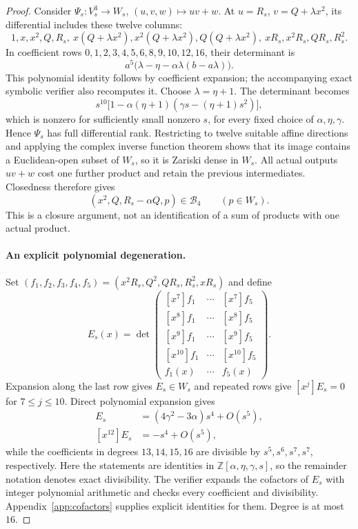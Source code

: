 \documentclass[11pt]{article}
\begin{document}
\begin{proof}
Consider $\Psi_s:V_s^3\to W_s$, $(u,v,w)\mapsto uv+w$.
At $u=R_s$, $v=Q+\lambda x^2$, its differential includes these twelve columns:
\begin{equation}\label{eq:minorcols}
 1,x,x^2,Q,R_s,\ x(Q+\lambda x^2),x^2(Q+\lambda x^2),
 Q(Q+\lambda x^2),\ xR_s,x^2R_s,QR_s,R_s^2.
\end{equation}
In coefficient rows $0,1,2,3,4,5,6,8,9,10,12,16$, their determinant is
\begin{equation}\label{eq:minor}
 a^5\bigl(\lambda-\eta-\alpha\lambda(b-a\lambda)\bigr).
\end{equation}
This polynomial identity follows by coefficient expansion; the accompanying
exact symbolic verifier also recomputes it. Choose $\lambda=\eta+1$.
The determinant becomes
\[
 s^{10}\bigl[1-\alpha(\eta+1)(\gamma s-(\eta+1)s^2)\bigr],
\]
which is nonzero for sufficiently small nonzero $s$, for every fixed choice
of $\alpha,\eta,\gamma$. Hence $\Psi_s$ has full differential rank.
Restricting to twelve suitable affine directions and applying the complex
inverse function theorem shows that its image contains a Euclidean-open
subset of $W_s$, so it is Zariski dense in $W_s$.
All actual outputs $uv+w$ cost one further product and retain the previous
intermediates. Closedness therefore gives
\begin{equation}\label{eq:joint}
 (x^2,Q,R_s-\alpha Q,p)\in\mathcal B_4\qquad(p\in W_s).
\end{equation}
This is a closure argument, not an identification of a sum of products with
one actual product.

\paragraph{An explicit polynomial degeneration.}
Set $(f_1,f_2,f_3,f_4,f_5)=(x^2R_s,Q^2,QR_s,R_s^2,xR_s)$ and define
\begin{equation}\label{eq:E}
 E_s(x)=\det\begin{pmatrix}
 [x^7]f_1&\cdots&[x^7]f_5\\
 [x^8]f_1&\cdots&[x^8]f_5\\
 [x^9]f_1&\cdots&[x^9]f_5\\
 [x^{10}]f_1&\cdots&[x^{10}]f_5\\
 f_1(x)&\cdots&f_5(x)
 \end{pmatrix}.
\end{equation}
Expansion along the last row gives $E_s\in W_s$ and repeated rows give
$[x^j]E_s=0$ for $7\le j\le10$. Direct polynomial expansion gives
\begin{align}
 [x^{11}]E_s&=(4\gamma^2-3\alpha)s^4+O(s^5),\label{eq:lead11}\\
 [x^{12}]E_s&=-s^4+O(s^5),\label{eq:lead12}
\end{align}
while the coefficients in degrees $13,14,15,16$ are divisible by
$s^5,s^6,s^7,s^7$, respectively. Here the statements are identities in
$\mathbb Z[\alpha,\eta,\gamma,s]$, so the remainder notation denotes exact
divisibility. The verifier expands the cofactors of $E_s$ with integer
polynomial arithmetic and checks every coefficient and divisibility.
Appendix~\ref{app:cofactors} supplies explicit identities
for them. Degree is at most $16$.


\end{proof}
\end{document}
